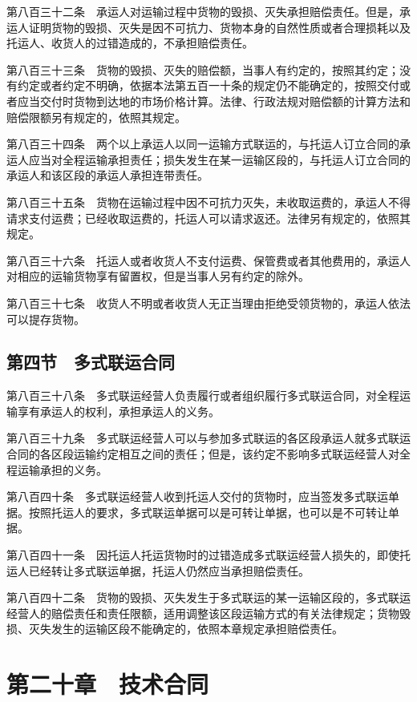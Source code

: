 \documentclass[UTF8,12pt,a4paper]{ctexbook}
\begin{document}
第八百三十二条　承运人对运输过程中货物的毁损、灭失承担赔偿责任。但是，承运人证明货物的毁损、灭失是因不可抗力、货物本身的自然性质或者合理损耗以及托运人、收货人的过错造成的，不承担赔偿责任。

第八百三十三条　货物的毁损、灭失的赔偿额，当事人有约定的，按照其约定；没有约定或者约定不明确，依据本法第五百一十条的规定仍不能确定的，按照交付或者应当交付时货物到达地的市场价格计算。法律、行政法规对赔偿额的计算方法和赔偿限额另有规定的，依照其规定。

第八百三十四条　两个以上承运人以同一运输方式联运的，与托运人订立合同的承运人应当对全程运输承担责任；损失发生在某一运输区段的，与托运人订立合同的承运人和该区段的承运人承担连带责任。

第八百三十五条　货物在运输过程中因不可抗力灭失，未收取运费的，承运人不得请求支付运费；已经收取运费的，托运人可以请求返还。法律另有规定的，依照其规定。

第八百三十六条　托运人或者收货人不支付运费、保管费或者其他费用的，承运人对相应的运输货物享有留置权，但是当事人另有约定的除外。

第八百三十七条　收货人不明或者收货人无正当理由拒绝受领货物的，承运人依法可以提存货物。

\subsection*{第四节　多式联运合同}

第八百三十八条　多式联运经营人负责履行或者组织履行多式联运合同，对全程运输享有承运人的权利，承担承运人的义务。

第八百三十九条　多式联运经营人可以与参加多式联运的各区段承运人就多式联运合同的各区段运输约定相互之间的责任；但是，该约定不影响多式联运经营人对全程运输承担的义务。

第八百四十条　多式联运经营人收到托运人交付的货物时，应当签发多式联运单据。按照托运人的要求，多式联运单据可以是可转让单据，也可以是不可转让单据。

第八百四十一条　因托运人托运货物时的过错造成多式联运经营人损失的，即使托运人已经转让多式联运单据，托运人仍然应当承担赔偿责任。

第八百四十二条　货物的毁损、灭失发生于多式联运的某一运输区段的，多式联运经营人的赔偿责任和责任限额，适用调整该区段运输方式的有关法律规定；货物毁损、灭失发生的运输区段不能确定的，依照本章规定承担赔偿责任。

\section*{第二十章　技术合同}
\end{document}
